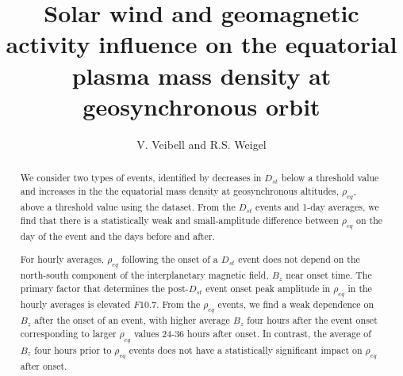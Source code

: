 \documentclass[12pt]{article}
\begin{document}
\title{Solar wind and geomagnetic activity influence on the equatorial plasma mass density at geosynchronous orbit}
\author{V. Veibell and R.S. Weigel}
\doublespacing
\maketitle




\begin{abstract}
We consider two types of events, identified by decreases in $D_{st}$ below a threshold value and increases in the the equatorial mass density at geosynchronous altitudes, $\rho_{eq}$, above a threshold value using the \cite{Takahashi2010} dataset.  From the $D_{st}$ events and 1-day averages, we find that there is a statistically weak and small-amplitude difference between $\rho_{eq}$ on the day of the event and the days before and after.  


For hourly averages, $\rho_{eq}$ following the onset of a $D_{st}$ event does not depend on the north-south component of the interplanetary magnetic field, $B_z$ near onset time. The primary factor that determines the post-$D_{st}$ event onset peak amplitude in $\rho_{eq}$ in the hourly averages is elevated $F10.7$.  From the $\rho_{eq}$ events, we find a weak dependence on $B_{z}$ after the onset of an event, with higher average $B_{z}$ four hours after the event onset corresponding to larger $\rho_{eq}$ values 24-36 hours after onset.  In contrast, the average of $B_z$ four hours prior to $\rho_{eq}$ events does not have a statistically significant impact on $\rho_{eq}$ after onset.
\end{abstract}
\end{document}
